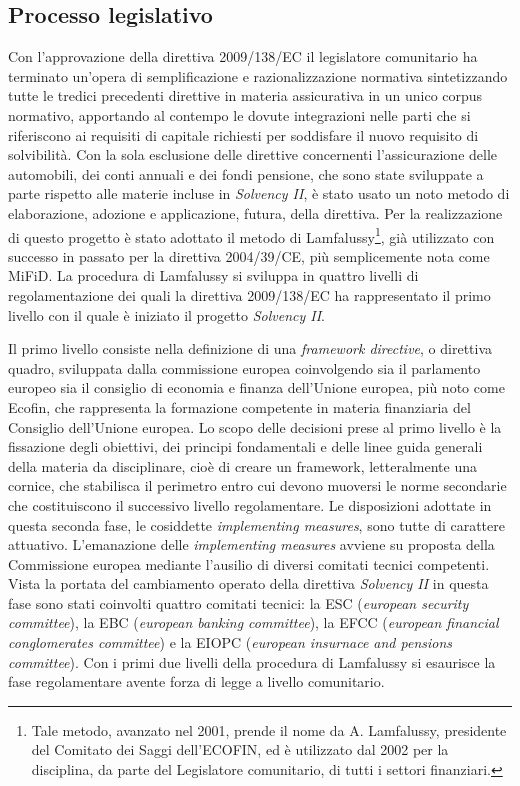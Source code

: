 \subsection{Processo legislativo}
\label{subs:lamfalussy}
Con l’approvazione della direttiva 2009/138/EC il legislatore comunitario ha terminato un’opera di semplificazione e razionalizzazione normativa sintetizzando tutte le tredici precedenti direttive in materia assicurativa in un unico corpus normativo, apportando al contempo le dovute integrazioni nelle parti che si riferiscono ai requisiti di capitale richiesti per soddisfare il nuovo requisito di solvibilità.
Con la sola esclusione delle direttive concernenti l’assicurazione delle automobili, dei conti annuali e dei fondi pensione, che sono state sviluppate a parte rispetto alle materie incluse in \textit{\textit{Solvency I}I}, è stato usato un noto metodo di elaborazione, adozione e applicazione, futura, della direttiva.
Per la realizzazione di questo progetto è stato adottato il metodo di Lamfalussy\footnote{Tale metodo, avanzato nel 2001, prende il nome da A. Lamfalussy, presidente del Comitato dei Saggi dell’ECOFIN, ed è utilizzato dal 2002 per la disciplina, da parte del Legislatore comunitario, di tutti i settori finanziari.}, già utilizzato con successo in passato per la direttiva 2004/39/CE, più semplicemente nota come MiFiD. La procedura di Lamfalussy si sviluppa in quattro livelli di regolamentazione dei quali la direttiva 2009/138/EC ha rappresentato il primo livello con il quale è iniziato il progetto \textit{\textit{Solvency I}I}.

Il primo livello consiste nella definizione di una {\itshape framework directive}, o direttiva quadro, sviluppata dalla commissione europea coinvolgendo sia il parlamento europeo sia il consiglio di economia e finanza dell’Unione europea, più noto come Ecofin, che rappresenta la formazione competente in materia finanziaria del Consiglio dell’Unione europea.
Lo scopo delle decisioni prese al primo livello è la fissazione degli obiettivi, dei principi fondamentali e delle linee guida generali della materia da disciplinare, cioè di creare un framework, letteralmente una cornice, che stabilisca il perimetro entro cui devono muoversi le norme secondarie che costituiscono il successivo livello regolamentare. Le disposizioni adottate in questa seconda fase, le cosiddette \textit{implementing measures}, sono tutte di carattere attuativo. L’emanazione delle \textit{implementing measures} avviene su proposta della Commissione europea mediante l’ausilio di diversi comitati tecnici competenti. Vista la portata del cambiamento operato della direttiva \textit{\textit{Solvency I}I} in questa fase sono stati coinvolti quattro comitati tecnici: la ESC ({\itshape european security committee}), la EBC ({\itshape european banking committee}), la EFCC ({\itshape european financial conglomerates committee}) e la EIOPC ({\itshape european insurnace and pensions committee}). 
Con i primi due livelli della procedura di Lamfalussy si esaurisce la fase regolamentare avente forza di legge a livello comunitario.

